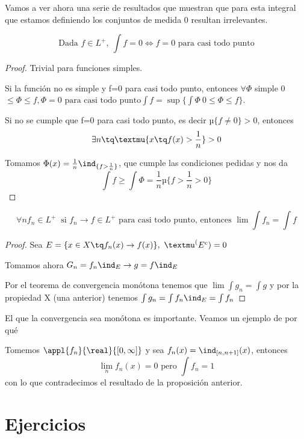 \documentclass{apuntes}
\begin{document}
Vamos a ver ahora una serie de resultados que muestran que para esta integral que estamos definiendo los conjuntos de medida 0 resultan irrelevantes.

\begin{prop}
\[\text{Dada }f \in L^+, \ \int f=0 \iff f=0 \text{ para casi todo punto}\]
\end{prop}
\begin{proof}
Trivial para funciones simples.

Si la función no es simple y f=0 para casi todo punto, entonces $\forall \Phi$ simple 0$\leq \Phi \leq f, \Phi=0 \text{ para casi todo punto} \int f = \sup\{\int \Phi \ 0 \leq \Phi \leq f\}$.

Si no se cumple que f=0 para casi todo punto, es decir $µ\{f\neq 0\}>0$, entonces
\[\exists n \tq µ\{x \tq f(x) > \frac{1}{n}\}>0\]

Tomamos $\Phi(x)=\frac{1}{n}\ind_{\{f > \frac{1}{n}\}}$, que cumple las condiciones pedidas y nos da
\[\int f \geq \int \Phi = \frac{1}{n}µ\{f>\frac{1}{n} > 0\}\]
\end{proof}

\begin{prop}
\[\forall n f_n \in L^+ \ \text{ si } f_n \rightarrow f \in L^+ \text{ para casi todo punto, entonces } \lim \int f_n = \int f\]
\end{prop}
\begin{proof}
Sea $E = \{x \in X \tq f_n(x) \rightarrow f(x)\}, \ µ^(E^c)=0$

Tomamos ahora $G_n = f_n \ind_{E} \rightarrow g=f\ind_E$

Por el teorema de convergencia monótona tenemos que $\lim \int g_n = \int g$ y por la propiedad X (una anterior) tenemos $\int g_n = \int f_n \ind_E = \int f_n$
\end{proof}

\obs El que la convergencia sea monótona es importante. Veamos un ejemplo de por qué
\begin{example}
Tomemos $\appl{f_n}{\real}{[0, \infty]}$ y sea $f_n(x) = \ind_{[n,n+1]}(x)$, entonces
\[\lim_n f_n(x) = 0 \text{ pero } \int f_n=1\]
con lo que contradecimos el resultado de la proposición anterior.
\end{example}

\appendix
\chapter{Ejercicios}




\printindex
\end{document}
